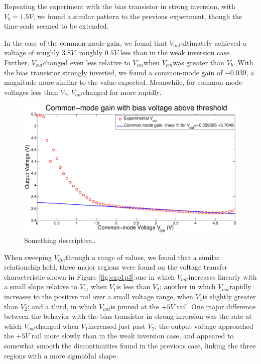 \documentclass{article}
\newcommand{\Vout}{{$V_{out}$}}
\newcommand{\Vb}{{$V_{b}$}}
\newcommand{\Vcm}{{$V_{cm}$}}
\newcommand{\Vdm}{{$V_{dm}$}}
\newcommand{\Vtwo}{{$V_{2}$}}
\newcommand{\Vone}{{$V_{1}$}}
\begin{document}
Repeating the experiment with the bias transistor in strong inversion, with $V_b = 1.5V$, we found a similar pattern to the previous experiment, though the time-scale seemed to be extended.

In the case of the common-mode gain, we found that \Vout ultimately achieved a voltage of roughly $3.8V$, roughly $0.5V$ less than in the weak inversion case. Further, \Vout changed even less relative to \Vcm when \Vcm was greater than \Vb. With the bias transistor strongly inverted, we found a common-mode gain of $-0.039$, a magnitude more similar to the value expected. Meanwhile, for common-mode voltages less than \Vb, \Vout changed far more rapidly.

\begin{figure}[H]
\centering
\includegraphics[width=\linewidth]{../Figures/Exp1P4.eps}
\caption{Something descriptive..}
\label{fig:exp1p4}
\end{figure}

When sweeping \Vdm through a range of values, we found that a similar relationship held, three major regions were found on the voltage transfer characteristic shown in Figure \ref{fig:exp1p3}:one in which \Vout increases linearly with a small slope relative to \Vone, when \Vone is less than \Vtwo; another in which \Vout rapidly increases to the positive rail over a small voltage range, when \Vone is slightly greater than \Vtwo; and a third, in which \Vout is pinned at the $+5V$ rail.
One major difference between the behavior with the bias transistor in strong inversion was the rate at which \Vout changed when \Vone increased just past \Vtwo; the output voltage approached the $+5V$ rail more slowly than in the weak inversion case, and appeared to somewhat smooth the discontinuities found in the previous case, linking the three regions with a more sigmoidal shape.
\end{document}
